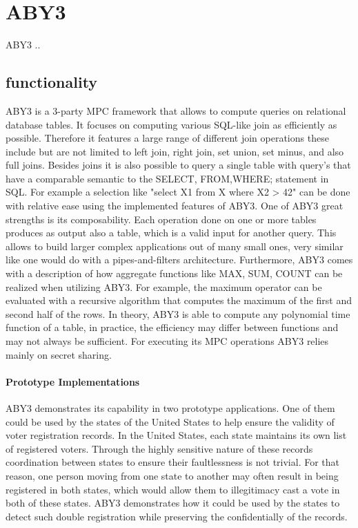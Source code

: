 \section{ABY3}
ABY3 ..
\subsection{functionality }
ABY3 is a 3-party MPC framework that allows to compute queries on relational database tables. It focuses on computing various SQL-like join as efficiently as possible. Therefore it features a large range of different join operations these include but are not limited to left join, right join, set union, set minus, and also full joins.  
Besides joins it is also possible to query a single table with query's that have a comparable semantic to the SELECT, FROM,WHERE; statement in SQL. For example a selection like "select X1 from X  where X2 > 42" can be done with relative ease using the implemented features of ABY3. One of ABY3 great strengths is its composability.
Each operation done on one or more tables produces as output also a table, which is a valid input for another query. This allows to build larger complex applications out of many small ones, very similar like one would do with a pipes-and-filters architecture. 
Furthermore, ABY3 comes with a description of how aggregate functions like MAX, SUM, COUNT can be realized when utilizing ABY3. For example, the maximum operator can be evaluated with a recursive algorithm that computes the maximum of the first and second half of the rows. In theory, ABY3 is able to compute any polynomial time function of a table, in practice, the efficiency may differ between functions and may not always be sufficient.   For executing its MPC operations ABY3 relies mainly on secret sharing.


\paragraph{Prototype Implementations}
ABY3 demonstrates its capability in two prototype applications. One of them could be used by the states of the United States to help ensure the validity of voter registration records. In the United States, each state maintains its own list of registered voters. Through the highly sensitive nature of these records coordination between states to ensure their faultlessness is not trivial. For that reason, one person moving from one state to another may often result in being registered in both states, which would allow them to illegitimacy cast a vote in both of these states.
ABY3 demonstrates how it could be used by the states to detect such double registration while preserving the confidentially of the records. 



